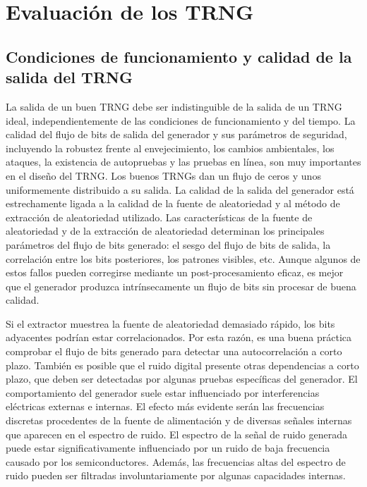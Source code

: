 	
	\section{Evaluación de los TRNG}
	
		\subsection{Condiciones de funcionamiento y calidad de la salida del TRNG}
	
	La salida de un buen TRNG debe ser indistinguible de la salida de un TRNG ideal, independientemente de las condiciones de funcionamiento y del tiempo. La calidad del flujo de bits de salida del generador y sus parámetros de seguridad, incluyendo la robustez frente al envejecimiento, los cambios ambientales, los ataques, la existencia de autopruebas y las pruebas en línea, son muy importantes en el diseño del TRNG. Los buenos TRNGs dan un flujo de ceros y unos uniformemente distribuido a su salida. La calidad de la salida del generador está estrechamente ligada a la calidad de la fuente de aleatoriedad y al método de extracción de aleatoriedad utilizado. Las características de la fuente de aleatoriedad y de la extracción de aleatoriedad determinan los principales parámetros del flujo de bits generado: el sesgo del flujo de bits de salida, la correlación entre los bits posteriores, los patrones visibles, etc. Aunque algunos de estos fallos pueden corregirse mediante un post-procesamiento eficaz, es mejor que el generador produzca intrínsecamente un flujo de bits sin procesar de buena calidad.
	
	Si el extractor muestrea la fuente de aleatoriedad demasiado rápido, los bits adyacentes podrían estar correlacionados. Por esta razón, es una buena práctica comprobar el flujo de bits generado para detectar una autocorrelación a corto plazo. También es posible que el ruido digital presente otras dependencias a corto plazo, que deben ser detectadas por algunas pruebas específicas del generador. El comportamiento del generador suele estar influenciado por interferencias eléctricas externas e internas. El efecto más evidente serán las frecuencias discretas procedentes de la fuente de alimentación y de diversas señales internas que aparecen en el espectro de ruido. El espectro de la señal de ruido generada puede estar significativamente influenciado por un ruido de baja frecuencia causado por los semiconductores. Además, las frecuencias altas del espectro de ruido pueden ser filtradas involuntariamente por algunas capacidades internas.

